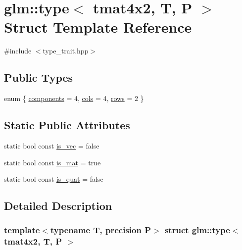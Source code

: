 \hypertarget{structglm_1_1type_3_01tmat4x2_00_01_t_00_01_p_01_4}{}\section{glm\+::type$<$ tmat4x2, T, P $>$ Struct Template Reference}
\label{structglm_1_1type_3_01tmat4x2_00_01_t_00_01_p_01_4}


{\ttfamily \#include $<$type\+\_\+trait.\+hpp$>$}

\subsection*{Public Types}
\begin{DoxyCompactItemize}
\item 
enum \{ \mbox{\hyperlink{structglm_1_1type_3_01tmat4x2_00_01_t_00_01_p_01_4_a300de81d86c74b714820e92a3b58c039a5b9d3e9f3b43424d02d43daed660e83d}{components}} = 4, 
\mbox{\hyperlink{structglm_1_1type_3_01tmat4x2_00_01_t_00_01_p_01_4_a300de81d86c74b714820e92a3b58c039af417a4e8d31ef0c65d17893ea4cc281d}{cols}} = 4, 
\mbox{\hyperlink{structglm_1_1type_3_01tmat4x2_00_01_t_00_01_p_01_4_a300de81d86c74b714820e92a3b58c039a701a8e9e567ad49ddd6517f4644cdb85}{rows}} = 2
 \}
\end{DoxyCompactItemize}
\subsection*{Static Public Attributes}
\begin{DoxyCompactItemize}
\item 
static bool const \mbox{\hyperlink{structglm_1_1type_3_01tmat4x2_00_01_t_00_01_p_01_4_a501af9781d0bcd0426334f04c96cd5d8}{is\+\_\+vec}} = false
\item 
static bool const \mbox{\hyperlink{structglm_1_1type_3_01tmat4x2_00_01_t_00_01_p_01_4_aa7e073a165d8540230bcd8bf27514179}{is\+\_\+mat}} = true
\item 
static bool const \mbox{\hyperlink{structglm_1_1type_3_01tmat4x2_00_01_t_00_01_p_01_4_aa84a332b30401e37a096b469f44dce09}{is\+\_\+quat}} = false
\end{DoxyCompactItemize}


\subsection{Detailed Description}
\subsubsection*{template$<$typename T, precision P$>$\newline
struct glm\+::type$<$ tmat4x2, T, P $>$}



